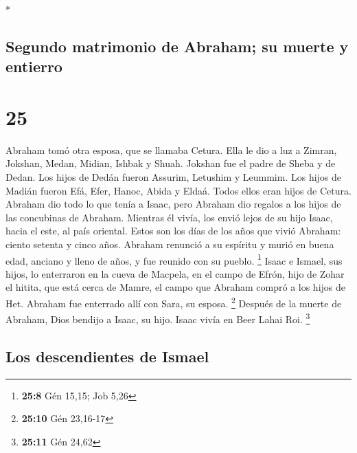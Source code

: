 \begin{paracol}{2}
\begin{otherlanguage}{english}
\end{otherlanguage}

\switchcolumn[0]*

\hypertarget{segundo-matrimonio-de-abraham-su-muerte-y-entierro}{%
\subsection{Segundo matrimonio de Abraham; su muerte y
entierro}\label{segundo-matrimonio-de-abraham-su-muerte-y-entierro}}

\hypertarget{section-48}{%
\section{25}\label{section-48}}

 Abraham tomó otra esposa, que se llamaba Cetura.
 Ella le dio a luz a Zimran, Jokshan, Medan, Midian,
Ishbak y Shuah.  Jokshan fue el padre de Sheba y de Dedan.
Los hijos de Dedán fueron Assurim, Letushim y Leummim. 
Los hijos de Madián fueron Efá, Efer, Hanoc, Abida y Eldaá. Todos ellos
eran hijos de Cetura.  Abraham dio todo lo que tenía a
Isaac,  pero Abraham dio regalos a los hijos de las
concubinas de Abraham. Mientras él vivía, los envió lejos de su hijo
Isaac, hacia el este, al país oriental.  Estos son los
días de los años que vivió Abraham: ciento setenta y cinco años.
 Abraham renunció a su espíritu y murió en buena edad,
anciano y lleno de años, y fue reunido con su pueblo. \footnote{\textbf{25:8}
  Gén 15,15; Job 5,26}  Isaac e Ismael, sus hijos, lo
enterraron en la cueva de Macpela, en el campo de Efrón, hijo de Zohar
el hitita, que está cerca de Mamre,  el campo que Abraham
compró a los hijos de Het. Abraham fue enterrado allí con Sara, su
esposa. \footnote{\textbf{25:10} Gén 23,16-17}  Después
de la muerte de Abraham, Dios bendijo a Isaac, su hijo. Isaac vivía en
Beer Lahai Roi. \footnote{\textbf{25:11} Gén 24,62}

\hypertarget{los-descendientes-de-ismael}{%
\subsection{Los descendientes de
Ismael}\label{los-descendientes-de-ismael}}


\end{paracol}
